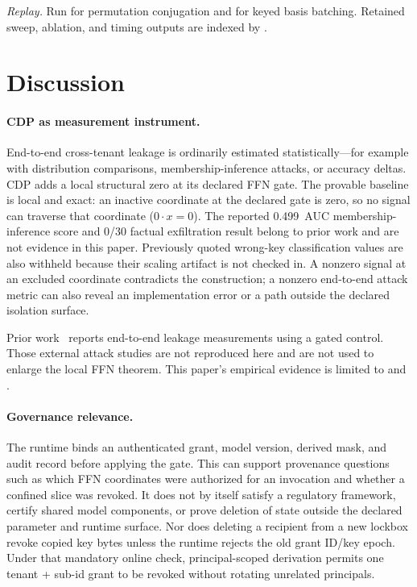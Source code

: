 \documentclass[11pt,a4paper]{article}
\begin{document}
\begin{sloppypar}
\noindent\textit{Replay.} Run
 for permutation
conjugation and  for keyed
basis batching.  Retained sweep, ablation, and timing outputs are
indexed by .
\end{sloppypar}

\section{Discussion}
\label{sec:discussion}

\paragraph{CDP as measurement instrument.}
End-to-end cross-tenant leakage is ordinarily estimated
statistically---for example with distribution comparisons,
membership-inference attacks, or accuracy deltas.  CDP adds a local
structural zero at its declared FFN gate.
The provable baseline is local and exact: an inactive coordinate at
the declared gate is zero, so no signal can traverse that coordinate
($0 \cdot x = 0$).  The reported 0.499~AUC membership-inference
score and 0/30 factual exfiltration result belong to prior work and
are not evidence in this paper.  Previously quoted wrong-key
classification values are also withheld because their scaling
artifact is not checked in.  A nonzero signal
at an excluded coordinate contradicts the construction; a nonzero
end-to-end attack metric can also reveal an implementation error or
a path outside the declared isolation surface.

Prior work~\citep{mccormick2026lora} reports end-to-end leakage
measurements using a gated control.  Those external attack studies
are not reproduced here and are not used to enlarge the local FFN
theorem.  This paper's empirical evidence is limited to
 and .

\paragraph{Governance relevance.}
The runtime binds an authenticated grant, model version, derived
mask, and audit record before applying the gate.  This can support
provenance questions such as which FFN coordinates were authorized
for an invocation and whether a confined slice was revoked.  It does
not by itself satisfy a regulatory framework, certify shared model
components, or prove deletion of state outside the declared
parameter and runtime surface.  Nor does deleting a recipient from a
new lockbox revoke copied key bytes unless the runtime rejects the old
grant ID/key epoch.  Under that mandatory online check,
principal-scoped derivation permits one tenant + sub-id grant to be
revoked without rotating unrelated principals.
\end{document}
